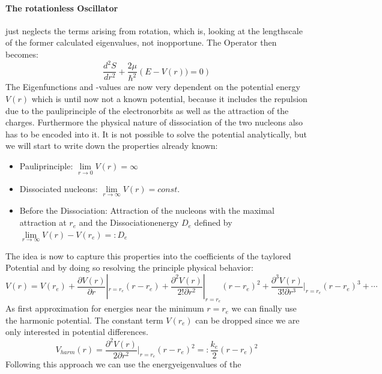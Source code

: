 \paragraph{The rotationless Oscillator} just neglects the terms
arising from rotation, which is, looking at the lengthscale of
the former calculated eigenvalues, not inopportune.
The Operator then becomes:
\begin{equation}
    \frac{d^2 S}{dr^2} + \frac{2\mu}{\hbar^2}
    \left ( E - V(r) ) = 0 \right )
\end{equation}
The Eigenfunctions and -values are now very dependent on the 
potential energy $V(r)$ which is until now not a known 
potential, because it includes the repulsion due to the
pauliprinciple of the electronorbits as well as the attraction
of the charges. Furthermore the physical nature of dissociation
of the two nucleons also has to be encoded into it.
It is not possible to solve the potential analytically, but 
we will start to write down the properties already known:
\begin{itemize}
        \item Pauliprinciple:
            $\lim\limits_{r \rightarrow 0}{V(r)} = \infty $
        \item Dissociated nucleons:
$\lim\limits_{r \rightarrow \infty}{V(r)} = const. $
\item Before the Dissociation: Attraction of the nucleons with
    the maximal attraction at $r_e$ and the Dissociationenergy
    $D_e$ defined by 
    $ \lim\limits_{r \rightarrow \infty}{V(r)} - V(r_e)=: D_e$ 
\end{itemize}
The idea is now to capture this properties into the coefficients
of the taylored Potential and by doing so resolving the principle
physical behavior:
\begin{equation}
    V(r) = V(r_e) 
   + \frac{\partial V(r)}{\partial r}|_{r=r_e}(r - r_e)
   + \frac{\partial^2 V(r)}{2!\partial r^2}|_{r=r_e}(r - r_e)^2
   + \frac{\partial^3 V(r)}{3!\partial r^3}|_{r=r_e}(r - r_e)^3
   + \cdots
\end{equation}
As first approximation for energies near the minimum $r=r_e$ we
can finally use the harmonic potential. The constant term
$V(r_e)$ can be dropped since we are only interested in 
potential differences.
\begin{equation}
    V_{harm}(r) =
    \frac{\partial^2 V(r)}{2\partial r^2}|_{r=r_e}(r - r_e)^2
    =: \frac{k_e}{2}(r-r_e)^2
\end{equation}
Following this approach we can use the energyeigenvalues of the

